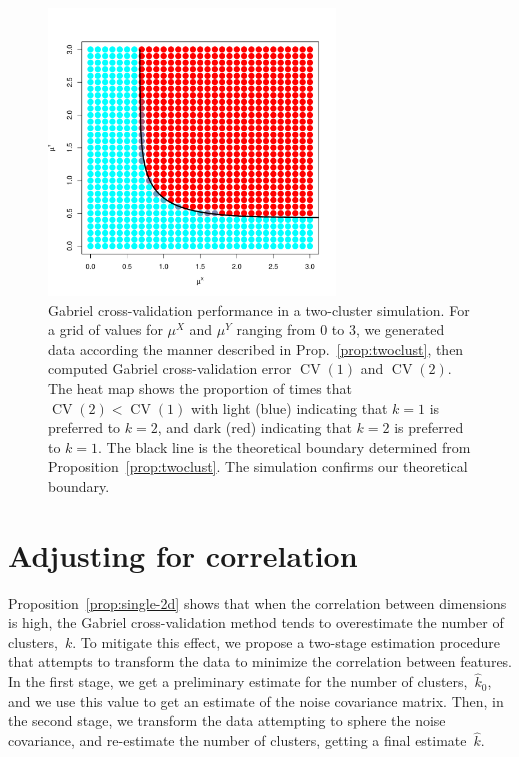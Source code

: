 \documentclass[12pt]{article}
\newcommand{\CV}{\operatorname{CV}}
\newcommand{\muX}{\mu^{X}}
\newcommand{\muY}{\mu^{Y}}
\begin{document}
\begin{figure}
\centering
\includegraphics[width=3in]{main_code/demo/overlap/color_plot.pdf}
\caption{
    Gabriel cross-validation performance in a two-cluster simulation.
    For a grid of values for $\muX$ and $\muY$ ranging from $0$ to $3$,
    we generated data according the manner described in
    Prop.~\ref{prop:twoclust}, then computed Gabriel cross-validation
    error $\CV(1)$ and $\CV(2)$. The heat map shows the proportion of times
    that $\CV(2) < \CV(1)$ with
    light (blue) indicating that $k = 1$ is preferred to $k = 2$, and
dark (red) indicating that $k = 2$ is preferred to $k = 1$.
    The black line is the theoretical boundary determined from
Proposition~\ref{prop:twoclust}. The simulation confirms our theoretical
    boundary.}
\label{fig:overlap-color_plot}
\end{figure}


\section{Adjusting for correlation}
\label{sec:corr-correct}


Proposition~\ref{prop:single-2d} shows that when the correlation between
dimensions is high, the Gabriel cross-validation method tends to overestimate
the number of clusters,~$k$. To mitigate this effect, we propose a two-stage
estimation procedure that attempts to transform the data to minimize the
correlation between features. In the first stage, we get a preliminary
estimate for the number of clusters,~$\hat k_0$, and we use this value to get
an estimate of the noise covariance matrix. Then, in the second stage, we
transform the data attempting to sphere the noise covariance, and re-estimate
the number of clusters, getting a final estimate~$\hat k$.
\end{document}
